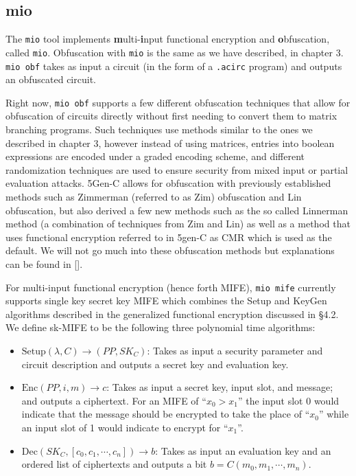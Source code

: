 \documentclass[12pt,twoside]{reedthesis}
\newcommand{\enc}[0]{\text{Enc}}
\newcommand{\dec}[0]{\text{Dec}}
\begin{document}
          \subsection{mio}
    \par The \texttt{mio} tool implements \textbf{m}ulti-\textbf{i}nput functional encryption and \textbf{o}bfuscation, called \texttt{mio}. Obfuscation with \texttt{mio} is the same as we have described, in chapter 3. \texttt{mio obf} takes as input a circuit (in the form of a \texttt{.acirc} program) and outputs an obfuscated circuit.
    \par Right now, \texttt{mio obf} supports a few different obfuscation techniques that allow for obfuscation of circuits directly without first needing to convert them to matrix branching programs. Such techniques use methods similar to the ones we described in chapter 3, however instead of using matrices, entries into boolean expressions are encoded under a graded encoding scheme, and different randomization techniques are used to ensure security from mixed input or partial evaluation attacks. 5Gen-C allows for obfuscation with previously established methods such as Zimmerman (referred to as Zim) obfuscation and Lin obfuscation, but also derived a few new methods such as the so called Linnerman method (a combination of techniques from Zim and Lin) as well as a method that uses functional encryption referred to in 5gen-C as CMR which is used as the default. We will not go much into these obfuscation methods but explanations can be found in [\cite{5genc}].
    \par For multi-input functional encryption (hence forth MIFE), \texttt{mio mife} currently supports single key secret key MIFE which combines the Setup and KeyGen algorithms described in the generalized functional encryption discussed in \S 4.2. We define sk-MIFE to be the following three polynomial time algorithms:
    \begin{itemize}
       \item$ \text{Setup}(\lambda,C) \to (PP,SK_C)$:
        Takes as input a security parameter and circuit description and outputs a secret key and evaluation key. 
        \item $\enc(PP,i,m) \to c$:
        Takes as input a secret key, input slot, and message; and outputs a ciphertext. For an MIFE of ``$x_0>x_1$'' the input slot 0 would indicate that the message should be encrypted to take the place of ``$x_0$'' while an input slot of 1 would indicate to encrypt for ``$x_1$''.    
        \item $\dec(SK_C,[c_0,c_1,\cdots,c_n]) \to b$:
        Takes as input an evaluation key and an ordered list of ciphertexts and outputs a bit $b = C(m_0,m_1,\cdots,m_n)$.
        \end{itemize}
\end{document}
